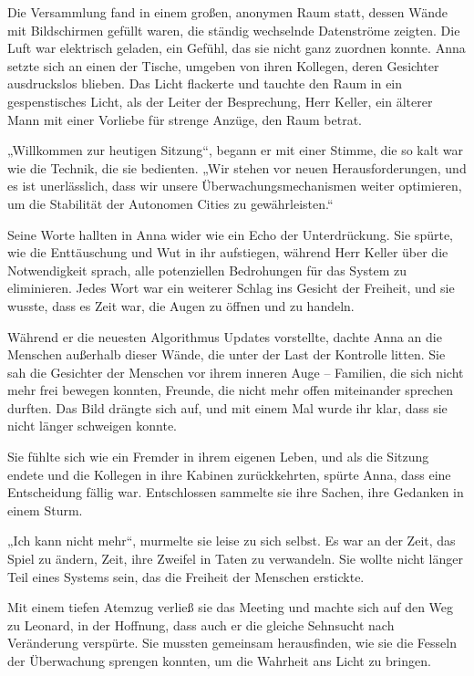 \documentclass[
]{article}
\begin{document}
Die Versammlung fand in einem großen, anonymen Raum statt, dessen Wände
mit Bildschirmen gefüllt waren, die ständig wechselnde Datenströme
zeigten. Die Luft war elektrisch geladen, ein Gefühl, das sie nicht ganz
zuordnen konnte. Anna setzte sich an einen der Tische, umgeben von ihren
Kollegen, deren Gesichter ausdruckslos blieben. Das Licht flackerte und
tauchte den Raum in ein gespenstisches Licht, als der Leiter der
Besprechung, Herr Keller, ein älterer Mann mit einer Vorliebe für
strenge Anzüge, den Raum betrat.

„Willkommen zur heutigen Sitzung``, begann er mit einer Stimme, die so
kalt war wie die Technik, die sie bedienten. „Wir stehen vor neuen
Herausforderungen, und es ist unerlässlich, dass wir unsere
Überwachungsmechanismen weiter optimieren, um die Stabilität der
Autonomen Cities zu gewährleisten.``

Seine Worte hallten in Anna wider wie ein Echo der Unterdrückung. Sie
spürte, wie die Enttäuschung und Wut in ihr aufstiegen, während Herr
Keller über die Notwendigkeit sprach, alle potenziellen Bedrohungen für
das System zu eliminieren. Jedes Wort war ein weiterer Schlag ins
Gesicht der Freiheit, und sie wusste, dass es Zeit war, die Augen zu
öffnen und zu handeln.

Während er die neuesten Algorithmus Updates vorstellte, dachte Anna an
die Menschen außerhalb dieser Wände, die unter der Last der Kontrolle
litten. Sie sah die Gesichter der Menschen vor ihrem inneren Auge --
Familien, die sich nicht mehr frei bewegen konnten, Freunde, die nicht
mehr offen miteinander sprechen durften. Das Bild drängte sich auf, und
mit einem Mal wurde ihr klar, dass sie nicht länger schweigen konnte.

Sie fühlte sich wie ein Fremder in ihrem eigenen Leben, und als die
Sitzung endete und die Kollegen in ihre Kabinen zurückkehrten, spürte
Anna, dass eine Entscheidung fällig war. Entschlossen sammelte sie ihre
Sachen, ihre Gedanken in einem Sturm.

„Ich kann nicht mehr``, murmelte sie leise zu sich selbst. Es war an der
Zeit, das Spiel zu ändern, Zeit, ihre Zweifel in Taten zu verwandeln.
Sie wollte nicht länger Teil eines Systems sein, das die Freiheit der
Menschen erstickte.

Mit einem tiefen Atemzug verließ sie das Meeting und machte sich auf den
Weg zu Leonard, in der Hoffnung, dass auch er die gleiche Sehnsucht nach
Veränderung verspürte. Sie mussten gemeinsam herausfinden, wie sie die
Fesseln der Überwachung sprengen konnten, um die Wahrheit ans Licht zu
bringen.
\end{document}
